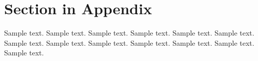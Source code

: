 \appendix

\section{Section in Appendix} \label{appendix-sec1}

Sample text. Sample text. Sample text. Sample text. Sample text. Sample text. 
Sample text. Sample text. Sample text. Sample text. Sample text. Sample text. 
Sample text. 